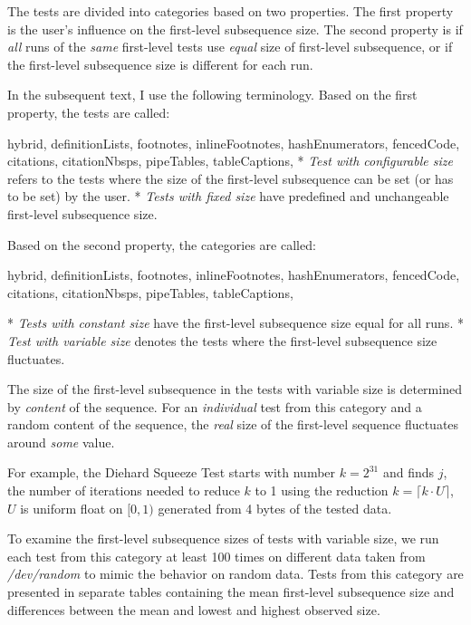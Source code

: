 \documentclass[
  digital,     %
  oneside,     %
  nosansbold,  %
  nocolorbold, %
  nolof,         %
  nolot,         %
]{fithesis4}
\begin{document}
The tests are divided into categories based on two properties. The first property is the user's influence on the first-level subsequence size. The second property is if \emph{all} runs of the \emph{same} first-level tests use \emph{equal} size of first-level subsequence, or if the first-level subsequence size is different for each run. 

In the subsequent text, I use the following terminology. Based on the first property, the tests are called:
\begin{markdown*}{%
  hybrid,
  definitionLists,
  footnotes,
  inlineFootnotes,
  hashEnumerators,
  fencedCode,
  citations,
  citationNbsps,
  pipeTables,
  tableCaptions,
}
* \emph{Test with configurable size} refers to the tests where the size of the first-level subsequence can be set (or has to be set) by the user.
* \emph{Tests with fixed size} have predefined and unchangeable first-level subsequence size.
\end{markdown*}
Based on the second property, the categories are called:
\begin{markdown*}{%
  hybrid,
  definitionLists,
  footnotes,
  inlineFootnotes,
  hashEnumerators,
  fencedCode,
  citations,
  citationNbsps,
  pipeTables,
  tableCaptions,
}

* \emph{Tests with constant size} have the first-level subsequence size equal for all runs.
* \emph{Test with variable size} denotes the tests where the first-level subsequence size fluctuates.

\end{markdown*}

The size of the first-level subsequence in the tests with variable size is determined by \emph{content} of the sequence. For an \emph{individual} test from this category and a random content of the sequence, the \emph{real} size of the first-level sequence fluctuates around \emph{some} value. 

For example, the Diehard Squeeze Test starts with number $k=2^{31}$ and finds $j$, the number of iterations needed to reduce $k$ to 1 using the reduction $k=\lceil k\cdot U \rceil $, $U$ is uniform float on $[0,1)$ generated from 4 bytes of the tested data.

To examine the first-level subsequence sizes of tests with variable size, we run each test from this category at least 100 times on different data taken from \emph{/dev/random} to mimic the behavior on random data. Tests from this category are presented in separate tables containing the mean first-level subsequence size and differences between the mean and lowest and highest observed size.
\end{document}
